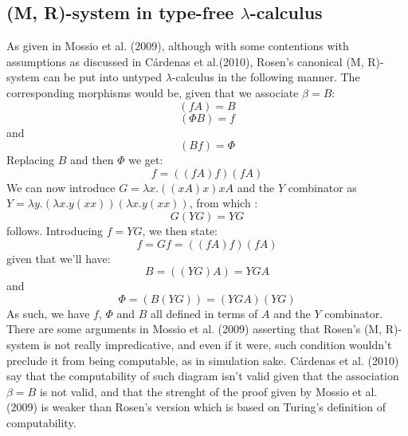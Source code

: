 \documentclass[a4paper,12pt,twoside,leqno]{article}
\begin{document}
\subsection*{(M, R)-system in type-free $\lambda$-calculus}
As given in Mossio et al. (2009), although with some contentions with assumptions as discussed in Cárdenas et al.(2010), Rosen's canonical (M, R)-system can be put into untyped $\lambda$-calculus in the following manner. The corresponding morphisms would be, given that we associate $\beta = B$:
$$
(fA) = B
$$
$$
(\Phi B) = f
$$
and
$$
(Bf) = \Phi
$$
Replacing $B$ and then $\Phi$ we get:
$$
f = ((fA)f)(fA)
$$
We can now introduce $G = \lambda x.((xA)x)xA$ and the $Y$ combinator as $Y = \lambda y.(\lambda x.y(xx))(\lambda x.y(xx))$, from which :
$$
G(YG) = YG
$$
follows. Introducing $f = YG$, we then state:
$$
f = Gf = ((fA)f)(fA)
$$
given that we'll have:
$$
B = ((YG)A) = YGA
$$
and
$$
\Phi = (B(YG)) = (YGA)(YG)
$$
As such, we have $f$, $\Phi$ and $B$ all defined in terms of $A$ and the $Y$ combinator. There are some arguments in Mossio et al. (2009) asserting that Rosen's (M, R)-system is not really impredicative, and even if it were, such condition wouldn't preclude it from being computable, as in simulation sake. Cárdenas et al. (2010) say that the computability of such diagram isn't valid given that the association $\beta = B$ is not valid, and that the strenght of the proof given by Mossio et al. (2009) is weaker than Rosen's version which is based on Turing's definition of computability. 
\end{document}
